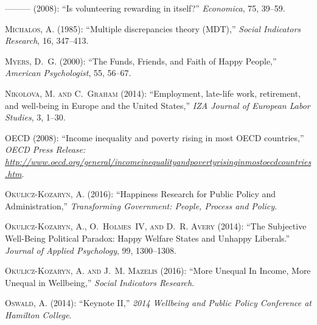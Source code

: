 \documentclass[10pt, letterpaper]{article}
\begin{document}
\begin{spacing}{1.4}
\begin{thebibliography}{71}
---\hspace{-.1pt}---\hspace{-.1pt}--- (2008{}): \enquote{Is
  volunteering rewarding in itself?} \emph{Economica}, 75, 39--59.

\textsc{Michalos, A.} (1985): \enquote{Multiple discrepancies theory (MDT),}
  \emph{Social Indicators Research}, 16, 347--413.

\textsc{Myers, D.~G.} (2000): \enquote{The Funds, Friends, and Faith of Happy
  People,} \emph{American Psychologist}, 55, 56--67.

\textsc{Nikolova, M. and C.~Graham} (2014): \enquote{Employment, late-life
  work, retirement, and well-being in Europe and the United States,} \emph{IZA
  Journal of European Labor Studies}, 3, 1--30.

\textsc{OECD} (2008): \enquote{Income inequality and poverty rising in most
  OECD countries,} \emph{OECD Press Release:
  \url{http://www.oecd.org/general/incomeinequalityandpovertyrisinginmostoecdcountries.htm}}.

\textsc{Okulicz-Kozaryn, A.} (2016): \enquote{Happiness Research for Public
  Policy and Administration,} \emph{Transforming Government: People, Process
  and Policy}.

\textsc{Okulicz-Kozaryn, A., O.~Holmes~IV, and D.~R. Avery} (2014):
  \enquote{The Subjective Well-Being Political Paradox: Happy Welfare States
  and Unhappy Liberals.} \emph{Journal of Applied Psychology}, 99, 1300--1308.

\textsc{Okulicz-Kozaryn, A. and J.~M. Mazelis} (2016): \enquote{More Unequal In
  Income, More Unequal in Wellbeing,} \emph{Social Indicators Research}.

\textsc{Oswald, A.} (2014): \enquote{Keynote II,} \emph{2014 Wellbeing and
  Public Policy Conference at Hamilton College}.


\end{thebibliography}
\end{spacing}
\end{document}
